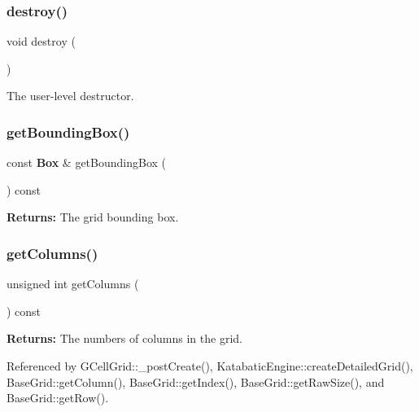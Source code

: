 \subsubsection{\texorpdfstring{destroy()}{destroy()}}
{\footnotesize\ttfamily void destroy (\begin{DoxyParamCaption}{ }\end{DoxyParamCaption})\hspace{0.3cm}{\ttfamily [inline]}}

The user-\/level destructor. \mbox{\label{classKatabatic_1_1BaseGrid_a4b6cf5a28d88d7ad3e6ddeac28a35a0b}} 
\subsubsection{\texorpdfstring{get\+Bounding\+Box()}{getBoundingBox()}}
{\footnotesize\ttfamily const \textbf{ Box} \& get\+Bounding\+Box (\begin{DoxyParamCaption}{ }\end{DoxyParamCaption}) const\hspace{0.3cm}{\ttfamily [inline]}}

{\bfseries Returns\+:} The grid bounding box. \mbox{\label{classKatabatic_1_1BaseGrid_aeaf0dae788f4c997e6172f9c734e3a91}} 
\subsubsection{\texorpdfstring{get\+Columns()}{getColumns()}}
{\footnotesize\ttfamily unsigned int get\+Columns (\begin{DoxyParamCaption}{ }\end{DoxyParamCaption}) const\hspace{0.3cm}{\ttfamily [inline]}}

{\bfseries Returns\+:} The numbers of columns in the grid. 

Referenced by G\+Cell\+Grid\+::\+\_\+post\+Create(), Katabatic\+Engine\+::create\+Detailed\+Grid(), Base\+Grid\+::get\+Column(), Base\+Grid\+::get\+Index(), Base\+Grid\+::get\+Raw\+Size(), and Base\+Grid\+::get\+Row().

